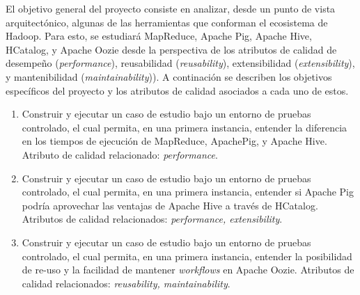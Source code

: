 El objetivo general del proyecto consiste en analizar, desde un punto de vista arquitectónico, algunas de las herramientas que conforman el ecosistema de Hadoop. Para esto, se estudiará MapReduce, Apache Pig, Apache Hive, HCatalog, y Apache Oozie desde la perspectiva de los atributos de calidad de desempeño (\textit{performance}), reusabilidad (\textit{reusability}), extensibilidad (\textit{extensibility}), y mantenibilidad (\textit{maintainability})). A continación se describen los objetivos específicos del proyecto y los atributos de calidad asociados a cada uno de estos. \\

\begin{enumerate}

\item
{
Construir y ejecutar un caso de estudio bajo un entorno de pruebas controlado, el cual permita, en una primera instancia, entender la diferencia en los tiempos de ejecución de MapReduce, ApachePig, y Apache Hive. Atributo de calidad relacionado: \textit{performance}.
}

\item
{
Construir y ejecutar un caso de estudio bajo un entorno de pruebas controlado, el cual permita, en una primera instancia, entender si Apache Pig podría aprovechar las ventajas de Apache Hive a través de HCatalog. Atributos de calidad relacionados: \textit{performance, extensibility}.
}

\item
{
Construir y ejecutar un caso de estudio bajo un entorno de pruebas controlado, el cual permita, en una primera instancia, entender la posibilidad de re-uso y la facilidad de mantener \textit{workflows} en Apache Oozie. Atributos de calidad relacionados: \textit{reusability, maintainability}.
}

\end{enumerate}
